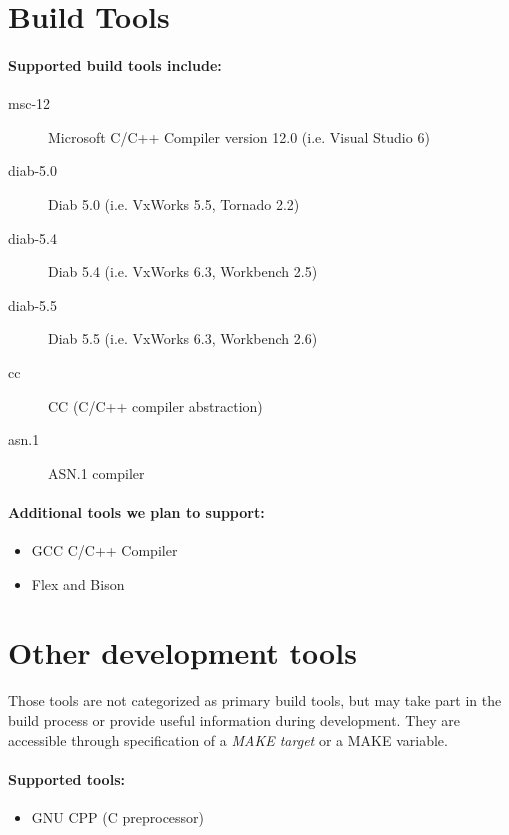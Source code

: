 \documentclass[a4paper]{article}
\begin{document}
\section{Build Tools}
\paragraph{Supported build tools include:}
\begin{description}
  \item[msc-12] Microsoft C/C++ Compiler version 12.0 (i.e. Visual Studio 6)
  \item[diab-5.0] Diab 5.0 (i.e. VxWorks 5.5, Tornado 2.2)
  \item[diab-5.4] Diab 5.4 (i.e. VxWorks 6.3, Workbench 2.5)
  \item[diab-5.5] Diab 5.5 (i.e. VxWorks 6.3, Workbench 2.6)
  \item[cc] CC (C/C++ compiler abstraction)
  \item[asn.1] ASN.1 compiler
\end{description}

\paragraph{Additional tools we plan to support:}
\begin{itemize}
  \item GCC C/C++ Compiler
  \item Flex and Bison
\end{itemize}

\section{Other development tools}
Those tools are not categorized as primary build tools, but may take part in the build process
or provide useful information during development. They are accessible through specification of a
\textsl{MAKE target} or a MAKE variable.
\paragraph{Supported tools:}
\begin{itemize}
  \item GNU CPP (C preprocessor)
\end{itemize}
\end{document}
